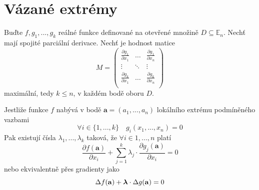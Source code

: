 \documentclass[../main.tex]{subfiles}
\begin{document}
\section{Vázané extrémy}

\begin{theorem}
	Buďte $f,g_1, ... , g_k$ reálné funkce definované na otevřené množině $D \subseteq \mathbb{E}_n$.
	Nechť mají spojité parciální derivace. Nechť je hodnost matice
	\[ M = \begin{pmatrix}
	\frac{\partial g_1}{\partial x_1} & \dots & \frac{\partial g_1}{\partial x_n}\\
	\vdots & \ddots & \vdots\\
	\frac{\partial g_k}{\partial x_1} & \dots & \frac{\partial g_k}{\partial x_n}\\
	\end{pmatrix}\]
	maximální, tedy $k \leq n$, v každém bodě oboru $D$.

	Jestliže funkce $f$ nabývá v bodě $\mathbf{a} = (a_1, ... , a_n)$ lokálního extrému podmíněného vazbami
	\[ \forall i \in \{ 1, ... , k \} \quad g_i(x_1, ... , x_n) = 0\]
	Pak existují čísla $\lambda _1, ... , \lambda _k$ taková, že $\forall i \in {1, ... , n}$ platí
	\[ \frac{\partial f(\mathbf{a})}{\partial x_i} + \sum_{j=1}^{k}\lambda_j \cdot \frac{\partial g_j(\mathbf{a})}{\partial x_i} = 0 \]
	nebo ekvivalentně přes gradienty jako
	\[ \Delta f(\mathbf{a}) + \mbox{\boldmath$\lambda$} \cdot \Delta g(\mathbf{a}) = 0\]
\end{theorem}
\end{document}
